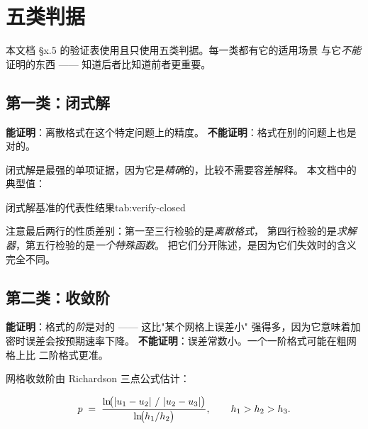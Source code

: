 \section{五类判据}
\label{sec:verify-criteria}

本文档 §x.5 的验证表使用且只使用五类判据。每一类都有它的适用场景
与它\emph{不能}证明的东西 —— 知道后者比知道前者更重要。

\subsection{第一类：闭式解}
\label{sec:verify-closed-form}

\textbf{能证明}：离散格式在这个特定问题上的精度。
\textbf{不能证明}：格式在别的问题上也是对的。

闭式解是最强的单项证据，因为它是\emph{精确}的，比较不需要容差解释。
本文档中的典型值：

\begin{veriftable}{闭式解基准的代表性结果}{tab:verify-closed}
\end{veriftable}

注意最后两行的性质差别：第一至三行检验的是\emph{离散格式}，
第四行检验的是\emph{求解器}，第五行检验的是\emph{一个特殊函数}。
把它们分开陈述，是因为它们失效时的含义完全不同。

\subsection{第二类：收敛阶}
\label{sec:verify-order}

\textbf{能证明}：格式的\emph{阶}是对的 —— 这比"某个网格上误差小"
强得多，因为它意味着加密时误差会按预期速率下降。
\textbf{不能证明}：误差常数小。一个一阶格式可能在粗网格上比
二阶格式更准。

网格收敛阶由 Richardson 三点公式估计：

\begin{equation}
p \;=\;
\frac{\ln\!\bigl(\left\lvert u_1-u_2 \right\rvert\,/\,\left\lvert u_2-u_3 \right\rvert\bigr)}
     {\ln\!\bigl(h_1/h_2\bigr)},
\qquad h_1>h_2>h_3 .
\label{eq:verify-richardson}
\end{equation}

